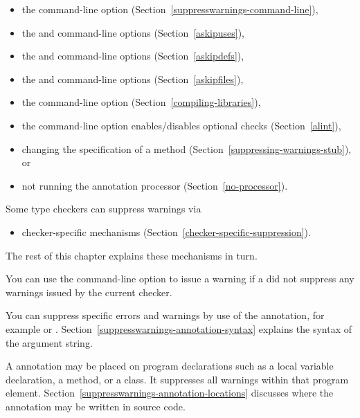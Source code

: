 \begin{itemize}
\item
  the  command-line option (Section~\ref{suppresswarnings-command-line}),
\item
  the  and  command-line options (Section~\ref{askipuses}),
\item
  the  and  command-line options (Section~\ref{askipdefs}),
\item
  the  and  command-line options (Section~\ref{askipfiles}),
\item
  the  command-line
  option (Section~\ref{compiling-libraries}),
\item
  the  command-line option enables/disables optional checks (Section~\ref{alint}),
\item
  changing the specification of a method (Section~\ref{suppressing-warnings-stub}), or
\item
  not running the annotation processor
  (Section~\ref{no-processor}).
\end{itemize}

Some type checkers can suppress warnings via
\begin{itemize}
\item
  checker-specific mechanisms (Section~\ref{checker-specific-suppression}).
\end{itemize}

\noindent
The rest of this chapter explains these mechanisms in turn.

You can use the  command-line option to issue a
warning if a  did not suppress any warnings issued by the current checker.



\begin{sloppypar}
You can suppress specific errors and warnings by use of the
 annotation, for example
 or .
Section~\ref{suppresswarnings-annotation-syntax} explains the syntax of the
argument string.
\end{sloppypar}

A 
annotation may be placed on program declarations such as a local
variable declaration, a method, or a class.  It suppresses all warnings
within that program element.
Section~\ref{suppresswarnings-annotation-locations} discusses where the
annotation may be written in source code.


